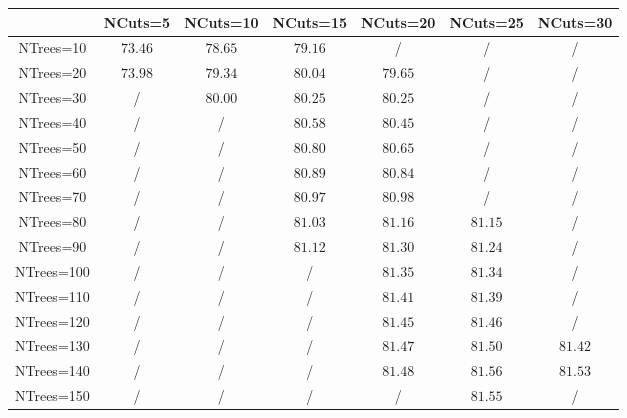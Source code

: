 \centering
\begin{tabular}{|c|c|c|c|c|c|c|} \hline
 & NCuts=5 & NCuts=10 & NCuts=15 & NCuts=20 & NCuts=25 & NCuts=30\\\hline
NTrees=10 & $73.46$ & $78.65$ & $79.16$ &  / &  / &  /\\\hline
NTrees=20 & $73.98$ & $79.34$ & $80.04$ & $79.65$ &  / &  /\\\hline
NTrees=30 &  / & $80.00$ & $80.25$ & $80.25$ &  / &  /\\\hline
NTrees=40 &  / &  / & $80.58$ & $80.45$ &  / &  /\\\hline
NTrees=50 &  / &  / & $80.80$ & $80.65$ &  / &  /\\\hline
NTrees=60 &  / &  / & $80.89$ & $80.84$ &  / &  /\\\hline
NTrees=70 &  / &  / & $80.97$ & $80.98$ &  / &  /\\\hline
NTrees=80 &  / &  / & $81.03$ & $81.16$ & $81.15$ &  /\\\hline
NTrees=90 &  / &  / & $81.12$ & $81.30$ & $81.24$ &  /\\\hline
NTrees=100 &  / &  / &  / & $81.35$ & $81.34$ &  /\\\hline
NTrees=110 &  / &  / &  / & $81.41$ & $81.39$ &  /\\\hline
NTrees=120 &  / &  / &  / & $81.45$ & $81.46$ &  /\\\hline
NTrees=130 &  / &  / &  / & $81.47$ & $81.50$ & $81.42$\\\hline
NTrees=140 &  / &  / &  / & $81.48$ & $81.56$ & $81.53$\\\hline
NTrees=150 &  / &  / &  / &  / & $81.55$ &  /\\\hline
\end{tabular}
